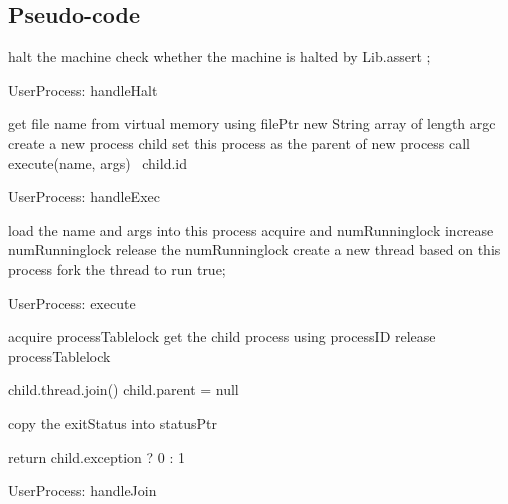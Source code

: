 \documentclass[a4paper,10pt]{article}
\begin{document}
\subsection{Pseudo-code}


\begin{algorithm}
\DontPrintSemicolon
{}
halt the machine\;
check whether the machine is halted by Lib.assert\;
;
\caption{UserProcess: handleHalt}
\label{algo:halt}
\end{algorithm}

\begin{algorithm}
\DontPrintSemicolon
{}
get file name from virtual memory using filePtr\;
new String array of length argc\;
create a new process child\;
set this process as the parent of new process\;
call execute(name, args)\;
\Return ~child.id
\caption{UserProcess: handleExec}
\label{algo:exec}
\end{algorithm}

\begin{algorithm}
\DontPrintSemicolon
{}
load the name and args into this process\;
acquire and numRunninglock\;
increase numRunninglock\;
release the numRunninglock\;
create a new thread based on this process\;
fork the thread to run\;
\Return true;
\caption{UserProcess: execute}
\label{algo:execute}
\end{algorithm}

\begin{algorithm}
\DontPrintSemicolon
{}

acquire processTablelock\;
get the child process using processID\;
release processTablelock\;


child.thread.join()\;
child.parent = null\;

copy the exitStatus into statusPtr\;

return child.exception ? 0 : 1\;

\caption{UserProcess: handleJoin}
\label{algo:join}
\end{algorithm}
\end{document}
